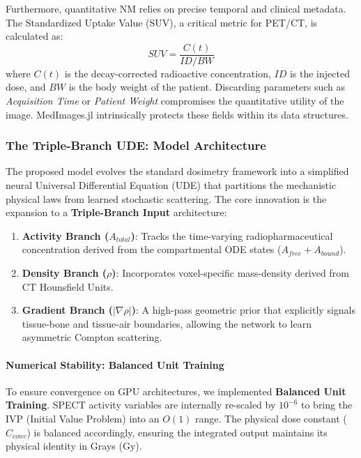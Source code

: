 \documentclass[a4paper,10pt,preprint]{elsarticle}
\begin{document}
Furthermore, quantitative NM relies on precise temporal and clinical metadata. The Standardized Uptake Value (SUV), a critical metric for PET/CT, is calculated as:
\begin{equation}
SUV = \frac{C(t)}{ID / BW}
\end{equation}
where $C(t)$ is the decay-corrected radioactive concentration, $ID$ is the injected dose, and $BW$ is the body weight of the patient. Discarding parameters such as \textit{Acquisition Time} or \textit{Patient Weight} compromises the quantitative utility of the image. MedImages.jl intrinsically protects these fields within its data structures.

\subsubsection{The Triple-Branch UDE: Model Architecture}
The proposed model evolves the standard dosimetry framework into a simplified neural Universal Differential Equation (UDE) that partitions the mechanistic physical laws from learned stochastic scattering.  The core innovation is the expansion to a \textbf{Triple-Branch Input} architecture:
\begin{enumerate}
    \item \textbf{Activity Branch ($A_{total}$)}: Tracks the time-varying radiopharmaceutical concentration derived from the compartmental ODE states ($A_{free} + A_{bound}$).
    \item \textbf{Density Branch ($\rho$)}: Incorporates voxel-specific mass-density derived from CT Hounsfield Units.
    \item \textbf{Gradient Branch ($|\nabla \rho|$)}: A high-pass geometric prior that explicitly signals tissue-bone and tissue-air boundaries, allowing the network to learn asymmetric Compton scattering.
\end{enumerate}

\paragraph{Numerical Stability: Balanced Unit Training}
To ensure convergence on GPU architectures, we implemented \textbf{Balanced Unit Training}. SPECT activity variables are internally re-scaled by $10^{-6}$ to bring the IVP (Initial Value Problem) into an $O(1)$ range. The physical dose constant ($C_{conv}$) is balanced accordingly, ensuring the integrated output maintains its physical identity in Grays (Gy).
\end{document}
